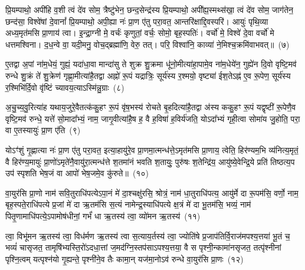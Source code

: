 प्रि॒यम्पाथो॒ अपी॑हि व॒शी त्वं दे॑व सोम॒ त्रैष्टु॑भेन॒ छन्द॒सेन्द्र॑स्य प्रि॒यम्पाथो॒ अपी᳚ह्य॒स्मथ्स॑खा॒ त्वं दे॑व सोम॒ जाग॑तेन॒ छन्द॑सा॒ विश्वे॑षां दे॒वानां᳚ प्रि॒यम्पाथो॒ अपी॒ह्या नः॑ प्रा॒ण ए॑तु परा॒वत॒ आन्तरि॑क्षाद्दि॒वस्परि॑। आयुः॑ पृथि॒व्या अध्य॒मृत॑मसि प्रा॒णाय॑ त्वा। इ॒न्द्रा॒ग्नी मे॒ वर्चः॑ कृणुतां॒ वर्चः॒ सोमो॒ बृह॒स्पतिः॑। वर्चो॑ मे॒ विश्वे॑ दे॒वा वर्चो॑ मे धत्तमश्विना। द॒ध॒न्वे वा॒ यदी॒मनु॒ वोच॒द्ब्रह्मा॑णि॒ वेरु॒ तत्। परि॒ विश्वा॑नि॒ काव्या॑ ने॒मिश्च॒क्रमि॑वाभवत्॥~(७)

{\anuvakamend[{शक्व॑रीष्व॒ग्नेर्बृह॒स्पतिः॒ पञ्च॑विꣳशतिश्च}]}%

ए॒तद्वा अ॒पां ना॑म॒धेयं॒ गुह्यं॒ यदा॑धा॒वा मान्दा॑सु ते शुक्र शु॒क्रमा धू॑नो॒मीत्या॑हा॒पामे॒व ना॑म॒धेये॑न॒ गुह्ये॑न दि॒वो वृष्टि॒मव॑ रुन्धे शु॒क्रं ते॑ शु॒क्रेण॑ गृह्णा॒मीत्या॑है॒तद्वा अह्नो॑ रू॒पं यद्रात्रिः॒ सूर्य॑स्य र॒श्मयो॒ वृष्ट्या॑ ईश॒ते\-ऽह्न॑ ए॒व रू॒पेण॒ सूर्य॑स्य र॒श्मिभि॑र्दि॒वो वृ॑ष्टिं च्यावय॒त्या\-ऽस्मि॑न्नु॒ग्राः~(८)

अ॒चु॒च्य॒वु॒रित्या॑ह यथाय॒जुरे॒वैतत्क॑कु॒हꣳ रू॒पं वृ॑ष॒भस्य॑ रोचते बृ॒हदित्या॑है॒तद्वा अ॑स्य ककु॒हꣳ रू॒पं यद्वृष्टी॑ रू॒पेणै॒व वृष्टि॒मव॑ रुन्धे॒ यत्ते॑ सो॒मादा᳚भ्यं॒ नाम॒ जागृ॒वीत्या॑है॒ष ह॒ वै ह॒विषा॑ ह॒विर्य॑जति॒ यो\-ऽदा᳚भ्यं गृही॒त्वा सोमा॑य जु॒होति॒ परा॒ वा ए॒तस्यायुः॑ प्रा॒ण ए॑ति~(९)

यो\-ऽꣳ॑शुं गृ॒ह्णात्या नः॑ प्रा॒ण ए॑तु परा॒वत॒ इत्या॒हायु॑रे॒व प्रा॒णमा॒त्मन्ध॑त्ते॒\-ऽमृत॑मसि प्रा॒णाय॒ त्वेति॒ हिर॑ण्यम॒भि व्य॑नित्य॒मृतं॒ वै हिर॑ण्य॒मायुः॑ प्रा॒णो॑\-ऽमृते॑नै॒वायु॑रा॒त्मन्ध॑त्ते श॒तमा॑नं भवति श॒तायुः॒ पुरु॑षः श॒तेन्द्रि॑य॒ आयु॑ष्ये॒वेन्द्रि॒ये प्रति॑ तिष्ठत्य॒प उप॑ स्पृशति भेष॒जं वा आपो॑ भेष॒जमे॒व कु॑रुते॥~(१०)

{\anuvakamend[{उ॒ग्रा ए॒त्याप॒स्त्रीणि॑ च}]}%

वा॒युर॑सि प्रा॒णो नाम॑ सवि॒तुराधि॑पत्ये\-ऽपा॒नं मे॑ दा॒श्चक्षु॑रसि॒ श्रोत्रं॒ नाम॑ धा॒तुराधि॑पत्य॒ आयु॑र्मे दा रू॒पम॑सि॒ वर्णो॒ नाम॒ बृह॒स्पते॒राधि॑पत्ये प्र॒जां मे॑ दा ऋ॒तम॑सि स॒त्यं नामेन्द्र॒स्याधि॑पत्ये क्ष॒त्रं मे॑ दा भू॒तम॑सि॒ भव्यं॒ नाम॑ पितृ॒णामाधि॑पत्ये॒\-ऽपामोष॑धीनां॒ गर्भं॑ धा ऋ॒तस्य॑ त्वा॒ व्यो॑मन ऋ॒तस्य॑~(११)

त्वा॒ विभू॑मन ऋ॒तस्य॑ त्वा॒ विध॑र्मण ऋ॒तस्य॑ त्वा स॒त्याय॒र्तस्य॑ त्वा॒ ज्योति॑षे प्र॒जा\-प॑तिर्वि॒राज॑मपश्य॒त्तया॑ भू॒तं च॒ भव्यं॑ चासृजत॒ तामृषि॑भ्यस्ति॒रो॑\-ऽदधा॒त्तां ज॒मद॑ग्नि॒स्तप॑सा\-ऽपश्य॒त्तया॒ वै स पृश्नी॒न्कामा॑नसृजत॒ तत्पृ॑श्नीनां पृश्नि॒त्वम् यत्पृश्न॑यो गृ॒ह्यन्ते॒ पृश्नी॑ने॒व तैः कामा॒न् यज॑मा॒नो\-ऽव॑ रुन्धे वा॒युर॑सि प्रा॒णः~(१२)

